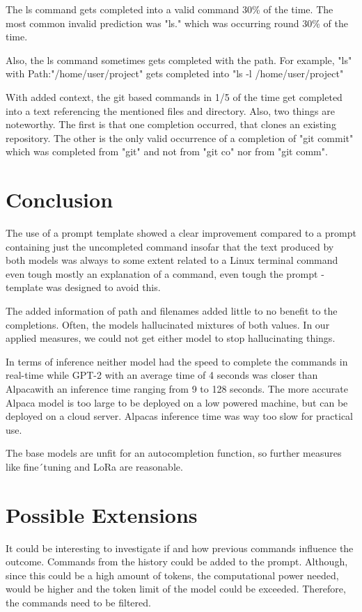 The ls command gets completed into a valid command 30\% of the time. The most common invalid prediction was "ls." which was occurring round 30\% of the time.


Also, the ls command sometimes gets completed with the path. For example, "ls" with Path:"/home/user/project" gets completed into "ls -l /home/user/project" 




With added context, the git based commands in 1/5 of the time get completed into a text referencing the mentioned files and directory. Also, two things are noteworthy. The first is that one completion occurred, that clones an existing repository. The other is the only valid occurrence of a completion of "git commit" which was completed from "git" and not from "git co" nor from "git comm".

\section{Conclusion}

The use of a prompt template showed a clear improvement compared to a prompt containing just the uncompleted command insofar that the text produced by both models was always to some extent related to a Linux terminal command even tough mostly an explanation of a command, even tough the prompt -template was designed to avoid this.


The added information of path and filenames added little to no benefit to the completions.
Often, the models hallucinated mixtures of both values. In our applied measures, we could not get either model to stop hallucinating things.

 

In terms of inference neither model had the speed to complete the commands in real-time while  GPT-2 with an average time of 4 seconds was closer than Alpacawith an inference time ranging from 9 to 128 seconds. The more accurate Alpaca model is too large to be deployed on a low powered machine, but can be deployed on a cloud server. Alpacas inference time was way too slow for practical use. 


The base models are unfit for an autocompletion function, so further measures like fine´tuning and LoRa are reasonable.


\section{Possible Extensions}
It could be interesting to investigate if and how previous commands influence the outcome. Commands from the history could be added to the prompt. Although, since this could be a high amount of tokens, the computational power needed, would be higher and the token limit of the model could be exceeded. Therefore, the commands need to be filtered. 





